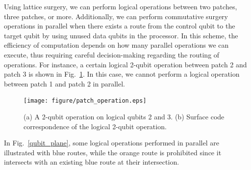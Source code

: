 \documentclass[a4paper,11pt]{ltjsarticle}
\begin{document}
{{        \clearpage

        Using lattice surgery, we can perform logical operations between two patches, three patches, or more. Additionally, we can perform commutative surgery operations in parallel when there exists a route from the control qubit to the target qubit by using unused data qubits in the processor. In this scheme, the efficiency of computation depends on how many parallel operations we can execute, thus requiring careful decision-making regarding the routing of operations. For instance, a certain logical 2-qubit operation between patch 2 and patch 3 is shown in Fig.~\ref{patch_operation}. In this case, we cannot perform a logical operation between patch 1 and patch 2 in parallel.

        \begin{figure}[h]
            \centering
            \texttt{[image: figure/patch\_operation.eps]}
            \vspace{0pt}\caption{(a) A 2-qubit operation on logical qubits 2 and 3. (b) Surface code correspondence of the logical 2-qubit operation.}
            \label{patch_operation}
            \vspace{-10pt}
        \end{figure}
        
        In Fig.~\ref{qubit_plane}, some logical operations performed in parallel are illustrated with blue routes, while the orange route is prohibited since it intersects with an existing blue route at their intersection.

}}
\end{document}
